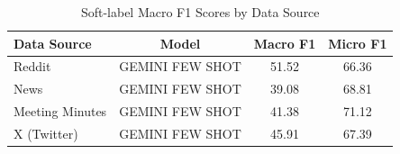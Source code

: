 \begin{table}[htbp]
\centering
\centering\caption{Soft-label Macro F1 Scores by Data Source}
\label{tab:best_macro_f1_scores}
\begin{tabular}{lccc}
\toprule
Data Source & Model & Macro F1 & Micro F1 \\
\midrule
Reddit & GEMINI FEW SHOT & 51.52 & 66.36 \\
News & GEMINI FEW SHOT & 39.08 & 68.81 \\
Meeting Minutes & GEMINI FEW SHOT & 41.38 & 71.12 \\
X (Twitter) & GEMINI FEW SHOT & 45.91 & 67.39 \\
\bottomrule
\end{tabular}
\end{table}